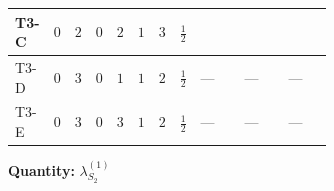\documentclass[8pt]{article}
\begin{document}
\begin{landscape}
\begin{longtable}{@{}llcccccc >{\raggedright\arraybackslash}p{0.21\linewidth} >{\raggedright\arraybackslash}p{0.21\linewidth} >{\raggedright\arraybackslash}p{0.21\linewidth}@{}}
\midrule
T3-C & $0$ & $2$ & $0$ & $2$ & $1$ & $3$ & $\frac{1}{2}$ & \scriptsize\adjustbox{max width=\linewidth}{$\begin{gathered} -9 {g_2}^2 {\lambda_{S_2}^{(1)}}\end{gathered}$} & \scriptsize\adjustbox{max width=\linewidth}{$\begin{gathered} +\frac{{\lambda_{12}^{(A)}}^2}{4}\end{gathered}$} & \scriptsize\adjustbox{max width=\linewidth}{$\begin{gathered} +\frac{{\lambda_{HS_2}^{(A)}}^2}{4}\end{gathered}$} \\
\midrule
T3-D & $0$ & $3$ & $0$ & $1$ & $1$ & $2$ & $\frac{1}{2}$ & --- & --- & --- \\
\midrule
T3-E & $0$ & $3$ & $0$ & $3$ & $1$ & $2$ & $\frac{1}{2}$ & --- & --- & --- \\
\midrule
\bottomrule
\end{longtable}
\clearpage
\noindent\textbf{Quantity: }$\lambda_{S_2}^{(1)}$\par\smallskip

\end{landscape}
\end{document}
